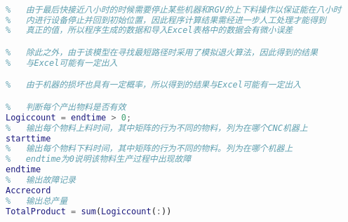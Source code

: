 \documentclass[no-math,withoutpreface,bwprint]{cumcmthesis} %
\numberwithin{equation}{section}
\numberwithin{figure}{section}
\numberwithin{table}{section}
\begin{document}
\begin{lstlisting}[language=matlab]
%   数据输出

%   由于最后快接近八小时的时候需要停止某些机器和RGV的上下料操作以保证能在八小时
%   内进行设备停止并回到初始位置，因此程序计算结果需经进一步人工处理才能得到
%   真正的值，所以程序生成的数据和导入Excel表格中的数据会有微小误差

%   除此之外，由于该模型在寻找最短路径时采用了模拟退火算法，因此得到的结果
%   与Excel可能有一定出入

%   由于机器的损坏也具有一定概率，所以得到的结果与Excel可能有一定出入

%   判断每个产出物料是否有效
Logiccount = endtime > 0;
%   输出每个物料上料时间，其中矩阵的行为不同的物料，列为在哪个CNC机器上
starttime
%   输出每个物料下料时间，其中矩阵的行为不同的物料。列为在哪个机器上
%   endtime为0说明该物料生产过程中出现故障
endtime
%   输出故障记录
Accrecord
%   输出总产量
TotalProduct = sum(Logiccount(:))
\end{lstlisting}
\end{document}
